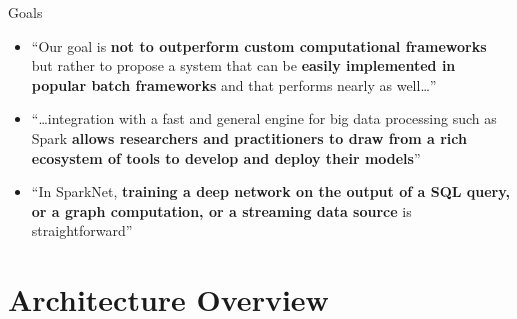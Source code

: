 \documentclass[pdf]{beamer}
\begin{document}
\begin{frame}{Goals}
    \begin{itemize}
        \item ``Our goal is \textbf{not to outperform custom computational
            frameworks} but rather to propose a system that can be \textbf{easily
            implemented in popular batch frameworks} and that performs
            nearly as well\ldots''
        \item ``\ldots integration with a fast and general engine for big data
            processing such as Spark \textbf{allows researchers and practitioners
            to draw from a rich ecosystem of tools to develop and deploy
            their models}''
        \item ``In SparkNet, \textbf{training a deep network on the output of a SQL
            query, or a graph computation, or a streaming data source} is
            straightforward''
    \end{itemize}
\end{frame}

\section{Architecture Overview}
\end{document}
